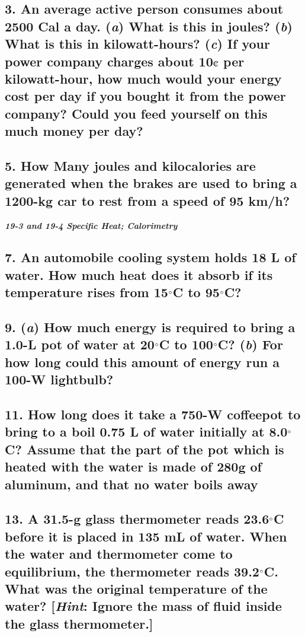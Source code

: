 \documentclass{article}
\begin{document}
\subsection*{3. An average active person consumes about 2500 Cal a day. (\textit a) What is this in joules? (\textit b) What is this in kilowatt-hours? (\textit c) If your power company charges about 10$\cent$ per kilowatt-hour, how much would your energy cost per day if you bought it from the power company? Could you feed yourself on this much money per day?}

\subsection*{5. How Many joules and kilocalories are generated when the brakes are used to bring a 1200-kg car to rest from a speed of 95 km/h?}
\vspace{1em}
\large{\textbf{\textit{19-3 and 19-4 Specific Heat; Calorimetry}}}

\subsection*{7. An automobile cooling system holds 18 L of water. How much heat does it absorb if its temperature rises from 15$\degree$C to 95$\degree$C?}

\subsection*{9. (\textit a) How much energy is required to bring a 1.0-L pot of water at 20$\degree$C to 100$\degree$C? (\textit b) For how long could this amount of energy run a 100-W lightbulb?}

\subsection*{11. How long does it take a 750-W coffeepot to bring to a boil 0.75 L of water initially at 8.0$\degree$C? Assume that the part of the pot which is heated with the water is made of 280g of aluminum, and that no water boils away}

\subsection*{13. A 31.5-g glass thermometer reads 23.6$\degree$C before it is placed in 135 mL of water. When the water and thermometer come to equilibrium, the thermometer reads 39.2$\degree$C. What was the original temperature of the water? [\textit{Hint}: Ignore the mass of fluid inside the glass thermometer.]}
\]
\end{document}
